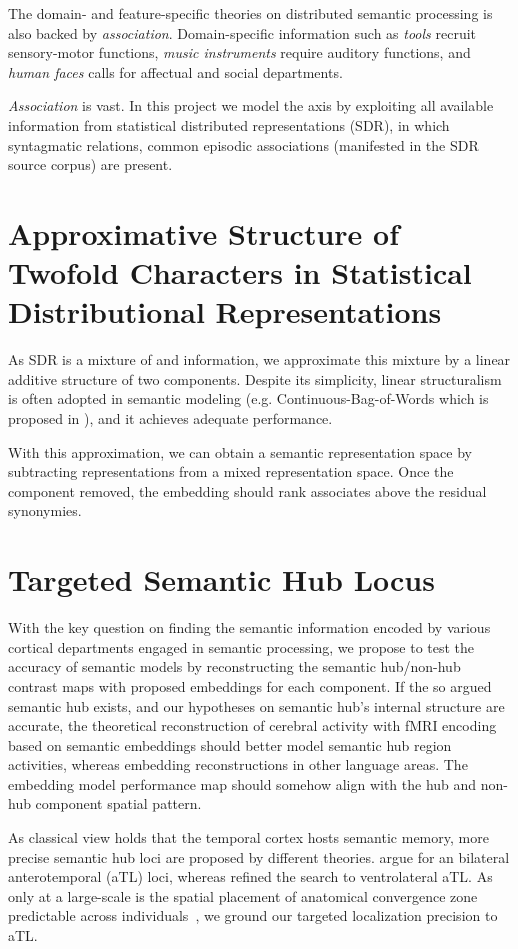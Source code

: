 The domain- and feature-specific theories on distributed semantic processing is also backed by \emph{association}. Domain-specific information such as \emph{tools} recruit sensory-motor functions, \emph{music instruments} require auditory functions, and \emph{human faces} calls for affectual and social departments. 

\emph{Association} is vast. In this project we model the \association axis by exploiting all available information from statistical distributed representations (SDR), in which syntagmatic relations, common episodic associations (manifested in the SDR source corpus) are present.

\section{Approximative Structure of Twofold Characters in Statistical Distributional Representations}

\label{subsection:hyplinearsemantics}
As SDR is a mixture of \similarity and \association information, we approximate this mixture by a linear additive structure of two components. Despite its simplicity, linear structuralism is often adopted in semantic modeling (e.g. Continuous-Bag-of-Words which is proposed in \textcite{mikolovEfficientEstimationWord2013}), and it achieves adequate performance. 

With this approximation, we can obtain a semantic \association representation space by subtracting \similarity representations from a mixed representation space. Once the \similarity component removed, the embedding should rank associates above the residual synonymies.

\section{Targeted Semantic Hub Locus}

With the key question on finding the semantic information encoded by various cortical departments engaged in semantic processing, we propose to test the accuracy of semantic models by reconstructing the semantic hub\slash non-hub contrast maps with proposed embeddings for each component. If the so argued semantic hub exists, and our hypotheses on semantic hub's internal structure are accurate, the theoretical reconstruction of cerebral activity with fMRI encoding based on semantic \similarity embeddings should better model semantic hub region activities, whereas \association embedding reconstructions in other language areas. The embedding model performance map should somehow align with the hub and non-hub component spatial pattern.

As classical view holds that the temporal cortex hosts semantic memory, more precise semantic hub loci are proposed by different theories. \textcite{priceMetaanalysesObjectNaming2005, pattersonWhereYouKnow2007, binderMappingAnteriorTemporal2011} argue for an bilateral anterotemporal (aTL) loci, whereas \textcite{lambon-ralphNeuralComputationalBases2017} refined the search to ventrolateral aTL. As only at a large-scale is the spatial placement of anatomical convergence zone predictable across individuals~\parencite{damasioNeuralSystemsWord2004}, we ground our targeted localization precision to aTL.